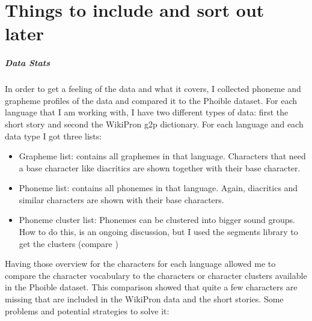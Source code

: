 \section{Things to include and sort out later}
\subparagraph{Data Stats}
In order to get a feeling of the data and what it covers, I collected phoneme and grapheme profiles of the data and compared it to the Phoible dataset. For each language that I am working with, I have two different types of data: first the short story and second the WikiPron \ac{g2p} dictionary. For each language and each data type I got three lists:
\begin{itemize}
 \item Grapheme list: contains all graphemes in that language. Characters that need a base character like diacritics are shown together with their base character. 
 \item Phoneme list: contains all phonemes in that language. Again, diacritics and similar characters are shown with their base characters.
 \item Phoneme cluster list: Phonemes can be clustered into bigger sound groups. How to do this, is an ongoing discussion, but I used the segments library to get the clusters (compare \citet{unicode-lingu})
\end{itemize}

Having those overview for the characters for each language allowed me to compare the character vocabulary to the characters or character clusters available in the Phoible dataset. This comparison showed that quite a few characters are missing that are included in the WikiPron data and the short stories. Some problems and potential strategies to solve it:

